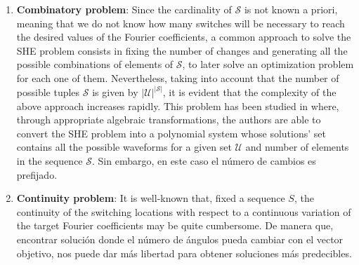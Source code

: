 \begin{enumerate}
    \item \textbf{Combinatory problem}: Since the cardinality of $\mathcal S$ is not known a priori, meaning that we do not know how many switches will be necessary to reach the desired values of the Fourier coefficients, a common approach to solve the SHE problem consists in fixing the number of changes and generating all the possible combinations of elements of $\mathcal S$, to later solve an optimization problem for each one of them. Nevertheless, taking into account that the number of possible tuples $\mathcal S$ is given by $|\mathcal{U}|^{|\mathcal S|}$, it is evident that the complexity of the above approach increases rapidly. This problem has been studied in \cite{Yang2015} where, through appropriate algebraic transformations, the authors are able to convert the SHE problem into a polynomial system whose solutions' set contains all the possible waveforms for a given set $\mathcal{U}$ and number of elements in the sequence $\mathcal S$.  Sin embargo, en este caso el número de cambios es prefijado.
	\item \textbf{Continuity problem}: It is well-known that, fixed a sequence $S$, the continuity of the switching locations with respect to a continuous variation of the target Fourier coefficients may be quite cumbersome. De manera que, encontrar solución donde el número de ángulos pueda cambiar con el vector objetivo, nos puede dar más libertad para obtener soluciones más predecibles. 
\end{enumerate}
%
%

%
%
